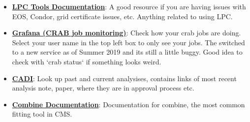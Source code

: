 \begin{itemize}
  \item \textbf{\href{https://uscms.org/uscms_at_work/physics/computing/setup/index.shtml}{LPC Tools Documentation}}:
    A good resource if you are having issues with EOS, Condor, grid certificate issues, etc. Anything related to using LPC. 

  \item \textbf{\href{https://monit-grafana.cern.ch/d/cmsTMGlobal/cms-tasks-monitoring-globalview?orgId=11}{Grafana (CRAB job monitoring)}}:
    Check how your crab jobs are doing. Select your user name in the top left box to only see your jobs. The switched to a new service as of Summer 2019 and its still a little buggy.
    Good idea to check with `crab status` if something looks weird. 

  \item \textbf{\href{http://cms.cern.ch/iCMS/analysisadmin/cadilines?awg=any&awgyear=2019}{CADI}}:
    Look up past and current analysises, contains links of most recent analysis note, paper, where they are in approval process etc. 

  \item \textbf{\href{https://github.com/cms-analysis/HiggsAnalysis-CombinedLimit/wiki}{Combine Documentation}}:
    Documentation for combine, the most common fitting tool in CMS. 





\end{itemize}


